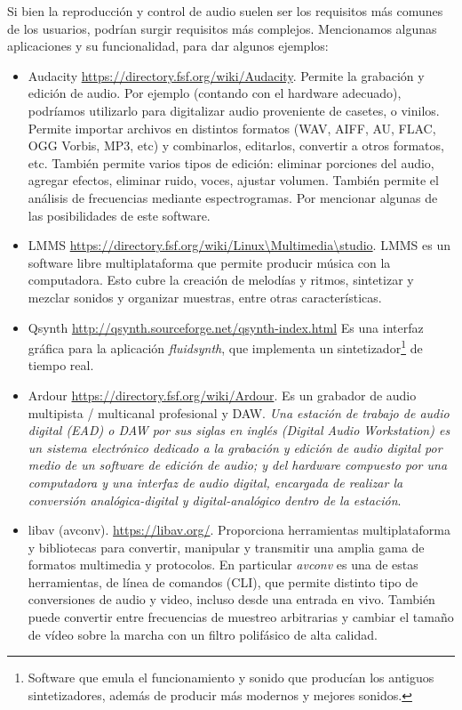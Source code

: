 \documentclass[12pt]{article}
\begin{document}
Si bien la reproducción y control de audio suelen ser los 
requisitos más comunes de los usuarios, podrían surgir requisitos 
más complejos. Mencionamos algunas aplicaciones y su funcionalidad, 
para dar algunos ejemplos: 

\begin{itemize}
\item Audacity \url{https://directory.fsf.org/wiki/Audacity}.  
Permite la grabación y edición de audio. Por ejemplo (contando con el 
hardware adecuado), podríamos utilizarlo para digitalizar audio proveniente
de casetes, o vinilos. Permite importar archivos en distintos formatos (WAV, 
AIFF, AU, FLAC, OGG Vorbis, MP3, etc) y combinarlos, editarlos, convertir a otros 
formatos, etc. También permite varios tipos de edición: eliminar porciones del 
audio, agregar efectos, eliminar ruido, voces, ajustar volumen. También permite 
el análisis de frecuencias mediante espectrogramas. Por mencionar algunas 
de las posibilidades de este software.  
\item LMMS \url{https://directory.fsf.org/wiki/Linux\Multimedia\studio}.
LMMS es un software libre multiplataforma que permite producir música con 
la computadora. Esto cubre la creación de melodías y ritmos, sintetizar 
y mezclar sonidos y organizar muestras, entre otras características. 
\item Qsynth \url{http://qsynth.sourceforge.net/qsynth-index.html}
Es una interfaz gráfica para la aplicación {\it fluidsynth}, que 
implementa un sintetizador\footnote{Software que emula el funcionamiento 
y sonido que producían los antiguos sintetizadores, además de producir 
más modernos y mejores sonidos.} de tiempo real. 
\item Ardour \url{https://directory.fsf.org/wiki/Ardour}. 
Es un grabador de audio multipista / multicanal profesional y DAW. 
{\it Una estación de trabajo de audio digital (EAD) o DAW por sus siglas 
en inglés (Digital Audio Workstation) es un sistema electrónico dedicado
a la grabación y edición de audio digital por medio de un software de 
edición de audio; y del hardware compuesto por una computadora y una 
interfaz de audio digital, encargada de realizar la conversión 
analógica-digital y digital-analógico dentro de la estación}\cite{wikidawes}.
\item libav (avconv). \url{https://libav.org/}. Proporciona herramientas 
multiplataforma y bibliotecas para convertir, manipular y transmitir 
una amplia gama de formatos multimedia y protocolos. En particular 
{\it avconv} es una de estas herramientas, de línea de comandos (CLI), 
que permite distinto tipo de conversiones de audio y video, incluso 
desde una entrada en vivo. También puede convertir entre frecuencias de
muestreo arbitrarias y cambiar el tamaño de vídeo sobre la marcha 
con un filtro polifásico de alta calidad. 
\end{itemize}
\end{document}
